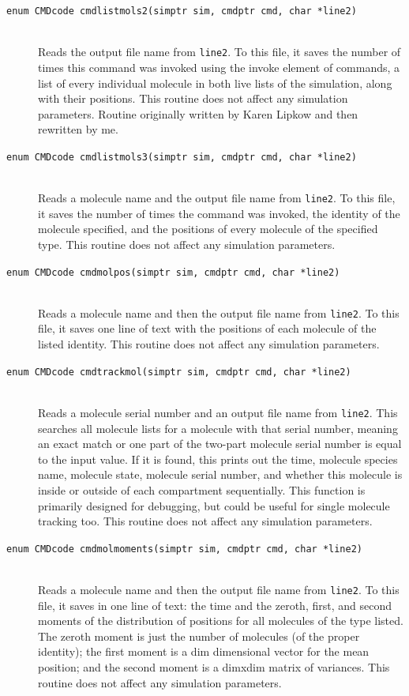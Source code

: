 \documentclass {scrbook}
\newcommand {\ttt} {\texttt}
\begin{document}
\begin{description}
\item[\ttt{enum CMDcode cmdlistmols2(simptr sim, cmdptr cmd, char *line2)}]
\hfill \\
Reads the output file name from \ttt{line2}. To this file, it saves the number of times this command was invoked using the invoke element of commands, a list of every individual molecule in both live lists of the simulation, along with their positions. This routine does not affect any simulation parameters. Routine originally written by Karen Lipkow and then rewritten by me.

\item[\ttt{enum CMDcode cmdlistmols3(simptr sim, cmdptr cmd, char *line2)}]
\hfill \\
Reads a molecule name and the output file name from \ttt{line2}. To this file, it saves the number of times the command was invoked, the identity of the molecule specified, and the positions of every molecule of the specified type. This routine does not affect any simulation parameters.

\item[\ttt{enum CMDcode cmdmolpos(simptr sim, cmdptr cmd, char *line2)}]
\hfill \\
Reads a molecule name and then the output file name from \ttt{line2}. To this file, it saves one line of text with the positions of each molecule of the listed identity. This routine does not affect any simulation parameters.

\item[\ttt{enum CMDcode cmdtrackmol(simptr sim, cmdptr cmd, char *line2)}]
\hfill \\
Reads a molecule serial number and an output file name from \ttt{line2}. This searches all molecule lists for a molecule with that serial number, meaning an exact match or one part of the two-part molecule serial number is equal to the input value. If it is found, this prints out the time, molecule species name, molecule state, molecule serial number, and whether this molecule is inside or outside of each compartment sequentially. This function is primarily designed for debugging, but could be useful for single molecule tracking too. This routine does not affect any simulation parameters.

\item[\ttt{enum CMDcode cmdmolmoments(simptr sim, cmdptr cmd, char *line2)}]
\hfill \\
Reads a molecule name and then the output file name from \ttt{line2}. To this file, it saves in one line of text: the time and the zeroth, first, and second moments of the distribution of positions for all molecules of the type listed. The zeroth moment is just the number of molecules (of the proper identity); the first moment is a dim dimensional vector for the mean position; and the second moment is a dimxdim matrix of variances. This routine does not affect any simulation parameters.


\end{description}
\end{document}
